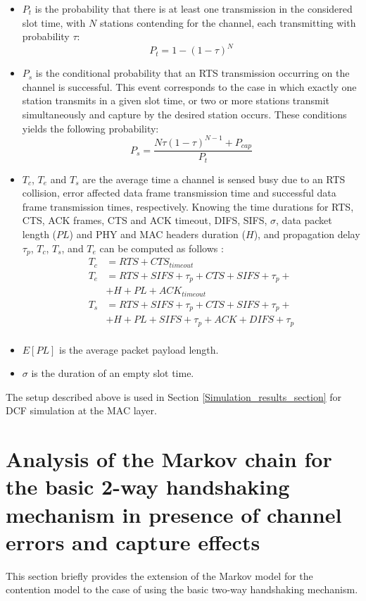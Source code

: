 \documentclass[10pt,onecolumn,a4paper]{IEEEtran}
\begin{document}
\begin{itemize}
\item $P_t$ is the probability that there is at least one
transmission in the considered slot time, with $N$ stations
contending for the channel, each transmitting with probability
$\tau$:
\begin{equation}
P_t=1-(1-\tau)^N
\end{equation}

\item $P_s$ is the conditional probability that an RTS
transmission occurring on the channel is successful. This event
corresponds to the case in which exactly one station transmits in
a given slot time, or two or more stations transmit simultaneously
and capture by the desired station occurs. These conditions yields the following
probability:
\begin{equation}
P_s=\frac{N\tau(1-\tau)^{N-1}+P_{cap}}{P_t}
\end{equation}

\item $T_c$, $T_e$ and $T_s$ are the average time a  channel is
sensed busy due to an RTS collision, error affected data frame
transmission time and successful data frame transmission times,
respectively. Knowing the time durations for RTS, CTS, ACK frames,
CTS and ACK timeout, DIFS, SIFS, $\sigma$, data packet length ($PL$) and
PHY and MAC headers duration ($H$), and propagation delay $\tau_p$,
$T_c$, $T_s$, and $T_e$ can be computed as follows \cite{kong}:
\begin{equation}\label{tempi_coll_error}
 \begin{array}{ll}
T_c       &= RTS+CTS_{timeout}            \\
T_e       &= RTS+SIFS+\tau_p+CTS+SIFS+\tau_p+\\
&+H+PL+ACK_{timeout}  \\
T_s       &= RTS+SIFS+ \tau_p+CTS+SIFS+\tau_p+\\
&+H+PL+SIFS+\tau_p+ACK+DIFS+\tau_p  \\
\end{array}
\end{equation}
\item $E[PL]$ is the average packet payload length.

\item $\sigma$ is the duration of an empty slot time.
\end{itemize}
The setup described above is used in Section
\ref{Simulation_results_section} for DCF simulation at the MAC
layer.
\section{Analysis of the Markov chain for the basic 2-way handshaking mechanism in
presence of channel errors and capture effects}
This section briefly provides the extension of the Markov model
for the contention model to the case of using the basic two-way
handshaking mechanism.
\end{document}

